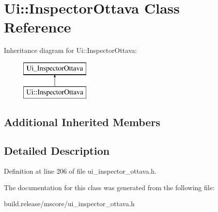 \hypertarget{class_ui_1_1_inspector_ottava}{}\section{Ui\+:\+:Inspector\+Ottava Class Reference}
\label{class_ui_1_1_inspector_ottava}
Inheritance diagram for Ui\+:\+:Inspector\+Ottava\+:\begin{figure}[H]
\begin{center}
\leavevmode
\includegraphics[height=2.000000cm]{class_ui_1_1_inspector_ottava}
\end{center}
\end{figure}
\subsection*{Additional Inherited Members}


\subsection{Detailed Description}


Definition at line 206 of file ui\+\_\+inspector\+\_\+ottava.\+h.



The documentation for this class was generated from the following file\+:\begin{DoxyCompactItemize}
\item 
build.\+release/mscore/ui\+\_\+inspector\+\_\+ottava.\+h\end{DoxyCompactItemize}
